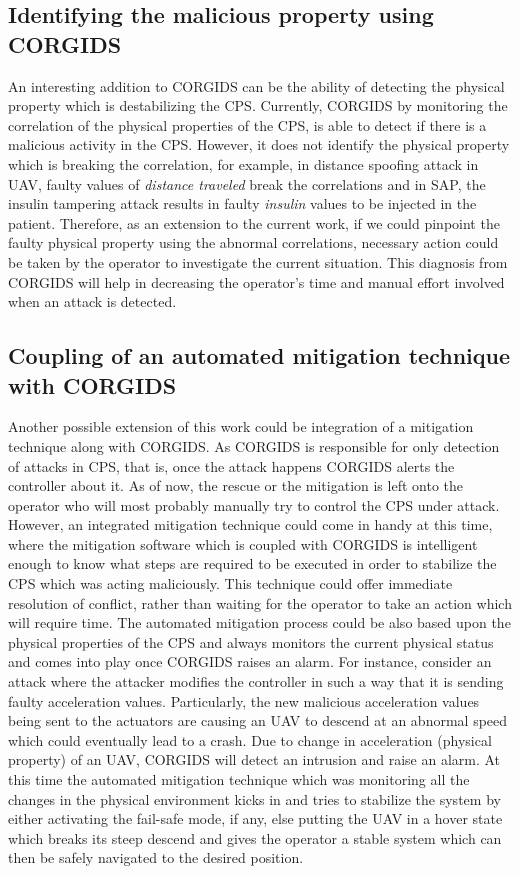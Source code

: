 \subsection{Identifying the malicious property using \ac{CORGIDS}}
An interesting addition to \ac{CORGIDS} can be the ability of detecting the physical property which is destabilizing the \ac{CPS}. Currently, \ac{CORGIDS} by monitoring the correlation of the physical properties of the \ac{CPS}, is able to detect if there is a malicious activity in the \ac{CPS}. However, it does not identify the physical property which is breaking the correlation, for example, in distance spoofing attack in \ac{UAV}, faulty values of \textit{distance traveled} break the correlations and in \ac{SAP}, the insulin tampering attack results in faulty \textit{insulin} values to be injected in the patient. Therefore, as an extension to the current work, if we could pinpoint the faulty physical property using the abnormal correlations, necessary action could be taken by the operator to investigate the current situation. This diagnosis from \ac{CORGIDS} will help in decreasing the operator's time and manual effort involved when an attack is detected.

\subsection{Coupling of an automated mitigation technique with \ac{CORGIDS}}
Another possible extension of this work could be integration of a mitigation technique along with \ac{CORGIDS}. As \ac{CORGIDS} is responsible for only  detection of attacks in \ac{CPS}, that is, once the attack happens \ac{CORGIDS} alerts the controller about it. As of now, the rescue or the mitigation is left onto the operator who will most probably manually try to control the \ac{CPS} under attack. However, an integrated mitigation technique could come in handy at this time, where the mitigation software which is coupled with \ac{CORGIDS} is intelligent enough to know what steps are required to be executed in order to  stabilize the \ac{CPS} which was acting maliciously. This technique could offer immediate resolution of conflict, rather than waiting for the operator to take an action which will require time. The automated mitigation process could be also based upon the physical properties of the \ac{CPS} and always monitors the current physical status and comes into play once \ac{CORGIDS} raises an alarm. For instance, consider an attack where the attacker modifies the controller in such a way that it is sending faulty acceleration values. Particularly, the new malicious acceleration values being sent to the actuators are causing an \ac{UAV} to descend at an abnormal speed which could eventually lead to a crash. Due to change in acceleration (physical property) of an \ac{UAV}, \ac{CORGIDS} will detect an intrusion and raise an alarm. At this time the automated mitigation technique which was monitoring all the changes in the physical environment kicks in and tries to stabilize the system by either activating the fail-safe mode, if any, else putting the \ac{UAV} in a hover state which breaks its steep descend and gives the operator a stable system which can then be safely navigated to the desired position.

 \endinput
